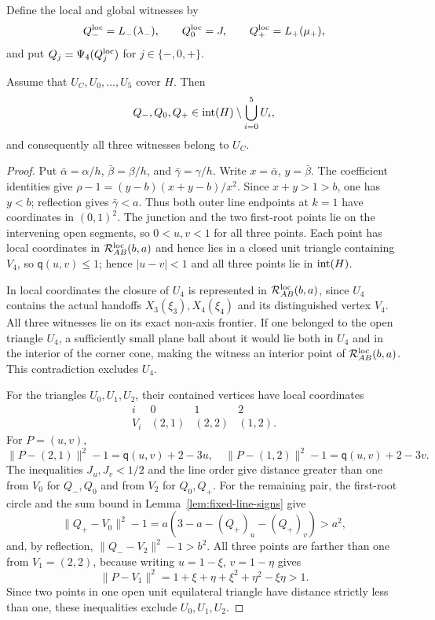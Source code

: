 Define the local and global witnesses by
\begin{equation}
 Q_-^{\rm loc}=L_-(\lambda_-),\qquad
 Q_0^{\rm loc}=J,\qquad
 Q_+^{\rm loc}=L_+(\mu_+),                       \label{eq:asym-witnesses}
\end{equation}
and put $Q_j=\Psi_4(Q_j^{\rm loc})$ for $j\in\{-,0,+\}$.

\begin{lemma}
\label{lem:asymmetric-core-witness}
Assume that $U_C,U_0,\ldots,U_5$ cover $H$.  Then
\[
 Q_-,Q_0,Q_+
 \in\mathrm{int}(H)\setminus\bigcup_{i=0}^5U_i,
\]
and consequently all three witnesses belong to $U_C$.
\end{lemma}

\begin{proof}
Put $\bar\alpha=\alpha/h$, $\bar\beta=\beta/h$, and $\bar\gamma=\gamma/h$.
Write $x=\bar\alpha$, $y=\bar\beta$. The coefficient identities give
$\rho-1=(y-b)(x+y-b)/x^2$. Since $x+y>1>b$, one has $y<b$;
reflection gives $\bar\gamma<a$. Thus both outer line endpoints at
$k=1$ have coordinates in $(0,1)^2$. The junction and the two first-root
points lie on the intervening open segments, so $0<u,v<1$ for all three points.  Each point has local coordinates in $\mathcal R_{AB}^{\rm loc}(b,a)$ and hence
lies in a closed unit triangle containing $V_4$, so
$\mathsf q(u,v)\le1$; hence
$|u-v|<1$ and all three points lie in $\mathrm{int}(H)$.

In local coordinates the closure of $U_4$ is represented in
$\mathcal R_{AB}^{\rm loc}(b,a)$, since $U_4$ contains the actual handoffs
$X_3(\xi_3),X_4(\xi_4)$ and its distinguished vertex $V_4$.  All three witnesses lie
on its exact non-axis frontier.  If one belonged to the open triangle $U_4$,
a sufficiently small plane ball about it would lie both in $U_4$ and in the
interior of the corner cone, making the witness an interior point of
$\mathcal R_{AB}^{\rm loc}(b,a)$. This contradiction excludes $U_4$.

For the triangles $U_0,U_1,U_2$, their contained vertices have local coordinates
\[
 \begin{array}{c|ccc}
 i&0&1&2\\ \hline
 V_i&(2,1)&(2,2)&(1,2).
 \end{array}
\]
For $P=(u,v)$,
\[
 \lVert P-(2,1)\rVert^2-1=\mathsf q(u,v)+2-3u,
 \quad
 \lVert P-(1,2)\rVert^2-1=\mathsf q(u,v)+2-3v.
\]
The inequalities $J_u,J_v<1/2$ and the line order give distance greater than
one from $V_0$ for $Q_-,Q_0$ and from $V_2$ for $Q_0,Q_+$.  For the remaining
pair, the first-root circle and the sum bound in
Lemma~\ref{lem:fixed-line-signs} give
\[
 \lVert Q_+-V_0\rVert^2-1
 =a(3-a-(Q_+)_u-(Q_+)_v)>a^2,
\]
and, by reflection, $\lVert Q_--V_2\rVert^2-1>b^2$.  All three points are
farther than one from $V_1=(2,2)$, because writing $u=1-\xi$, $v=1-\eta$
gives
\[
 \lVert P-V_1\rVert^2
 =1+\xi+\eta+\xi^2+\eta^2-\xi\eta>1.
\]
Since two points in one open unit equilateral triangle have distance strictly
less than one, these inequalities exclude $U_0,U_1,U_2$.


\end{proof}
